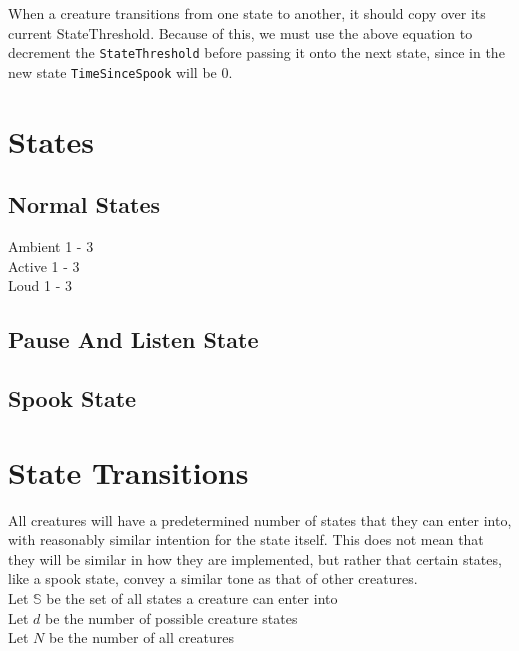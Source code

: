 \documentclass{article}
\newcommand{\code}{\texttt}
\begin{document}
When a creature transitions from one state to another, it should copy over its current StateThreshold. Because of this, we must use the above equation to decrement the \code{StateThreshold} before passing it onto the next state, since in the new state \code{TimeSinceSpook} will be 0. 



\clearpage
\section{States}

\subsection{Normal States}

Ambient 1 - 3\\
Active 1 - 3\\
Loud 1 - 3\\

\subsection{Pause And Listen State}


\subsection{Spook State}




\clearpage
\section{State Transitions}
All creatures will have a predetermined number of states that they can enter into, with reasonably similar intention for the state itself. This does not mean that they will be similar in how they are implemented, but rather that certain states, like a spook state, convey a similar tone as that of other creatures.\\

Let $\mathbb{S}$ be the set of all states a creature can enter into\\
Let $d$ be the number of possible creature states\\
Let $N$ be the number of all creatures\\
\end{document}
